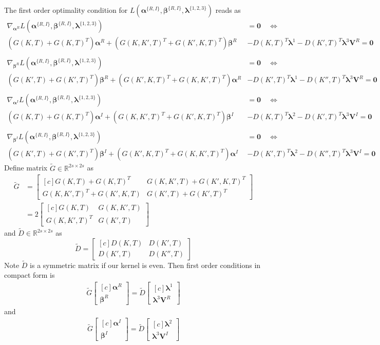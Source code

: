 \documentclass[11pt]{article}
\newcommand{\RR}{\mathbb{R}}
\newcommand{\balpha}{\bm \alpha}
\newcommand{\blambda}{\bm \lambda}
\newcommand{\bbeta}{\bm \beta}
\newcommand{\bmat}[2]{
	\begin{bmatrix*}[#1]
		#2
	\end{bmatrix*}
}
\begin{document}
The first order optimality condition for $ L(\balpha^{\{R,I\}},\bbeta^{\{R,I\}}, \blambda^{\{1,2,3\}}) $ reads as
\begin{align}
	\nabla_{\balpha^R}L(\balpha^{\{R,I\}},\bbeta^{\{R,I\}}, \blambda^{\{1,2,3\}}) &= \bm 0 \quad\Leftrightarrow\\
	\left(G(K,T)+G(K,T)^T \right)\balpha^R + \left(G(K,K',T)^T+G(K',K,T)^T\right)\bbeta^R& - D(K,T)^T\blambda^1-D(K',T)^T\blambda^3\bm V^R = \bm 0\\ \\
\nabla_{\bbeta^R}L(\balpha^{\{R,I\}},\bbeta^{\{R,I\}}, \blambda^{\{1,2,3\}}) &= \bm 0 \quad\Leftrightarrow \\
\left(G(K',T)+G(K',T)^T \right)\bbeta^R + \left(G(K',K,T)^T+G(K,K',T)^T\right)\balpha^R &- D(K',T)^T\blambda^1-D(K'',T)^T\blambda^3\bm V^R = \bm 0\\\\
\nabla_{\balpha^I}L(\balpha^{\{R,I\}},\bbeta^{\{R,I\}}, \blambda^{\{1,2,3\}}) &= \bm 0 \quad\Leftrightarrow\\
\left(G(K,T)+G(K,T)^T \right)\balpha^I + \left(G(K,K',T)^T+G(K',K,T)^T\right)\bbeta^I &- D(K,T)^T\blambda^2-D(K',T)^T\blambda^3\bm V^I = \bm 0\\\\
\nabla_{\bbeta^I}L(\balpha^{\{R,I\}},\bbeta^{\{R,I\}}, \blambda^{\{1,2,3\}}) &= \bm 0 \quad\Leftrightarrow \\
\left(G(K',T)+G(K',T)^T \right)\bbeta^I + \left(G(K',K,T)^T+G(K,K',T)^T\right)\balpha^I &- D(K',T)^T\blambda^2-D(K'',T)^T\blambda^3\bm V^I = \bm 0
\end{align}
Define matrix $ \tilde{G}\in \RR^{2s\times 2s} $ as
\begin{align}
	\tilde{G}& = \bmat{c}{G(K,T)+G(K,T)^T & G(K,K',T) + G(K',K,T)^T \\ G(K,K',T)^T + G(K',K,T) &G(K',T)+G(K',T)^T }\\
	& =  2 \bmat{c}{G(K,T) & G(K,K',T)  \\ G(K,K',T)^T  &G(K',T) }
\end{align}
and $ \tilde{D}\in \RR^{2s\times 2s} $ as
\[\tilde{D} = \bmat{c}{D(K,T) & D(K',T)\\D(K',T) & D(K'',T)  }\]
Note $ \tilde{D} $ is a symmetric matrix if our kernel is even. 
Then first order conditions in compact form is
\begin{align}
	\tilde{G} \bmat{c}{\balpha^R\\ \bbeta^R} = \tilde{D} \bmat{c}{\blambda^1\\ \blambda^3 \bm V^R} 
\end{align}
and 
\begin{align}
\tilde{G} \bmat{c}{\balpha^I\\ \bbeta^I} = \tilde{D} \bmat{c}{\blambda^2\\ \blambda^3 \bm V^I} 
\end{align}


\end{document}
